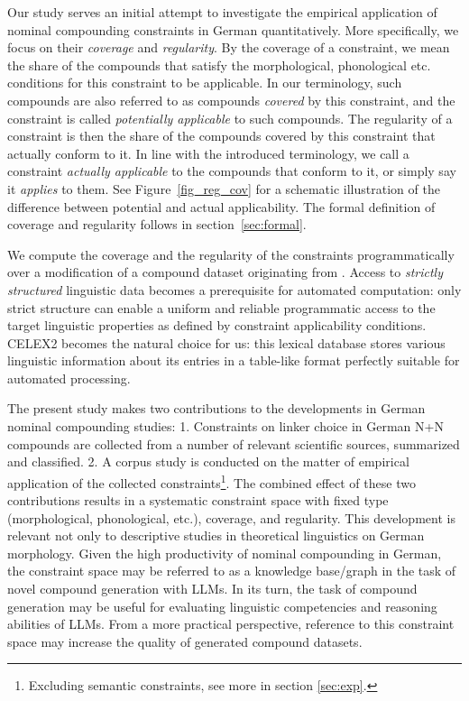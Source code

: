 \documentclass[10pt, a4paper]{article}
\begin{document}
Our study serves an initial attempt to investigate the empirical application of nominal compounding constraints in German quantitatively. More specifically, we focus on their \textit{coverage} and \textit{regularity}. By the coverage of a constraint, we mean the share of the compounds that satisfy the morphological, phonological etc. conditions for this constraint to be applicable. In our terminology, such compounds are also referred to as compounds \textit{covered} by this constraint, and the constraint is called \textit{potentially applicable} to such compounds. The regularity of a constraint is then the share of the compounds covered by this constraint that actually conform to it. In line with the introduced terminology, we call a constraint \textit{actually applicable} to the compounds that conform to it, or simply say it \textit{applies} to them. See Figure~\ref{fig_reg_cov} for a schematic illustration of the difference between potential and actual applicability. The formal definition of coverage and regularity follows in section~\ref{sec:formal}.

We compute the coverage and the regularity of the constraints programmatically over a modification of a compound dataset originating from . Access to \textit{strictly structured} linguistic data becomes a prerequisite for automated computation: only strict structure can enable a uniform and reliable programmatic access to the target linguistic properties as defined by constraint applicability conditions. CELEX2  becomes the natural choice for us: this lexical database stores various linguistic information about its entries in a table-like format perfectly suitable for automated processing.

The present study makes two contributions to the developments in German nominal compounding studies: 1. Constraints on linker choice in German N+N compounds are collected from a number of relevant scientific sources, summarized and classified. 2. A corpus study is conducted on the matter of empirical application of the collected constraints\footnote{Excluding semantic constraints, see more in section \ref{sec:exp}.}. The combined effect of these two contributions results in a systematic constraint space with fixed type (morphological, phonological, etc.), coverage, and regularity. This development is relevant not only to descriptive studies in theoretical linguistics on German morphology. Given the high productivity of nominal compounding in German, the constraint space may be referred to as a knowledge base/graph in the task of novel compound generation with LLMs. In its turn, the task of compound generation may be useful for evaluating linguistic competencies and reasoning abilities of LLMs. From a more practical perspective, reference to this constraint space may increase the quality of generated compound datasets.
\end{document}
